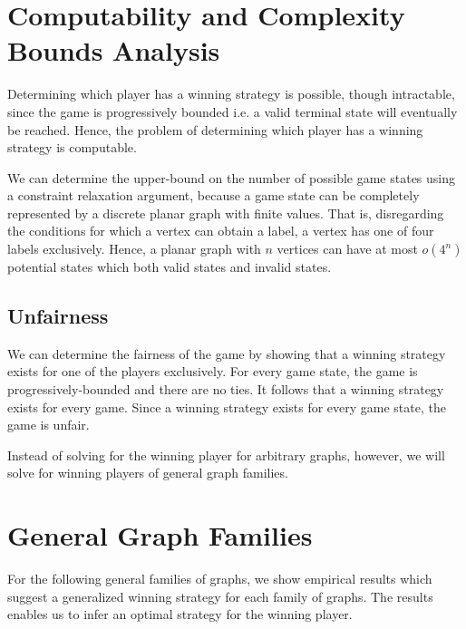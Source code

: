 \documentclass{sig-alternate}
\begin{document}
\section{Computability and Complexity Bounds Analysis}

Determining which player has a winning strategy is possible, though
intractable, since the game is progressively bounded i.e. a valid terminal
state will eventually be reached. Hence, the problem of determining which
player has a winning strategy is computable.

We can determine the upper-bound on the number of possible game states using a
constraint relaxation argument, because a game state can be completely
represented by a discrete planar graph with finite values. That is,
disregarding the conditions for which a vertex can obtain a label, a vertex has
one of four labels exclusively. Hence, a planar graph with $n$ vertices can
have at most $o(4^n)$ potential states which both valid states and invalid
states. 

\subsection{Unfairness}

We can determine the fairness of the game by showing that a winning strategy
exists for one of the players exclusively. For every game state, the game is
progressively-bounded and there are no ties. It follows that a winning strategy
exists for every game. Since a winning strategy exists for every game state,
the game is unfair.

Instead of solving for the winning player for arbitrary graphs, however, we
will solve for winning players of general graph families.

\section{General Graph Families}

For the following general families of graphs, we show empirical results which
suggest a generalized winning strategy for each family of graphs. The results
enables us to infer an optimal strategy for the winning player.
\end{document}
